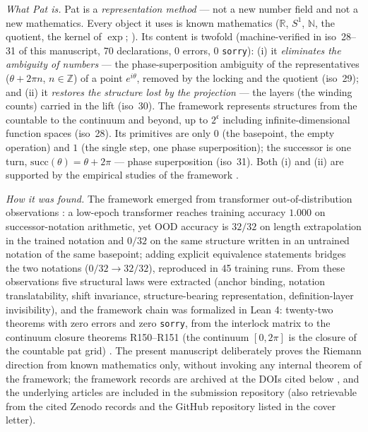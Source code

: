 \documentclass{article}
\begin{document}
\emph{What Pat is.} Pat is a \emph{representation method} --- not a new
number field and not a new mathematics. Every object it uses is known
mathematics ($\mathbb R$, $S^1$, $\mathbb N$, the quotient, the kernel
of $\exp$; \cite{hatcher,halmos}). Its content is twofold
(machine-verified in iso~28--31 of this manuscript, 70 declarations, 0
errors, 0 \texttt{sorry}): (i) it \emph{eliminates the ambiguity of
numbers} --- the phase-superposition ambiguity of the representatives
($\theta+2\pi n$, $n\in\mathbb Z$) of a point $e^{i\theta}$, removed by
the locking and the quotient (iso~29); and (ii) it \emph{restores the
structure lost by the projection} --- the layers (the winding counts)
carried in the lift (iso~30). The framework represents structures from
the countable to the continuum and beyond, up to $2^{\mathfrak c}$
including infinite-dimensional function spaces (iso~28). Its primitives
are only $0$ (the basepoint, the empty operation) and $1$ (the single
step, one phase superposition); the successor is one turn,
$\mathrm{succ}(\theta)=\theta+2\pi$ --- phase superposition (iso~31).
Both (i) and (ii) are supported by the empirical studies of the
framework \cite{patbase}.

\emph{How it was found.} The framework emerged from transformer
out-of-distribution observations \cite{patbase}: a low-epoch
transformer reaches training accuracy $1.000$ on successor-notation
arithmetic, yet OOD accuracy is $32/32$ on length extrapolation in the
trained notation and $0/32$ on the same structure written in an
untrained notation of the same basepoint; adding explicit equivalence
statements bridges the two notations ($0/32\to 32/32$), reproduced in
45 training runs. From these observations five structural laws were
extracted (anchor binding, notation translatability, shift invariance,
structure-bearing representation, definition-layer invisibility), and
the framework chain was formalized in Lean 4: twenty-two theorems with
zero errors and zero \texttt{sorry}, from the interlock matrix to the
continuum closure theorems R150--R151 (the continuum $[0,2\pi]$ is the
closure of the countable pat grid) \cite{patbase}. The present
manuscript deliberately proves the Riemann direction from known
mathematics only, without invoking any internal theorem of the
framework; the framework records are archived at the DOIs cited below
\cite{zenodo}, and the underlying articles are included in the
submission repository (also retrievable from the cited Zenodo records
and the GitHub repository listed in the cover letter).
\end{document}
